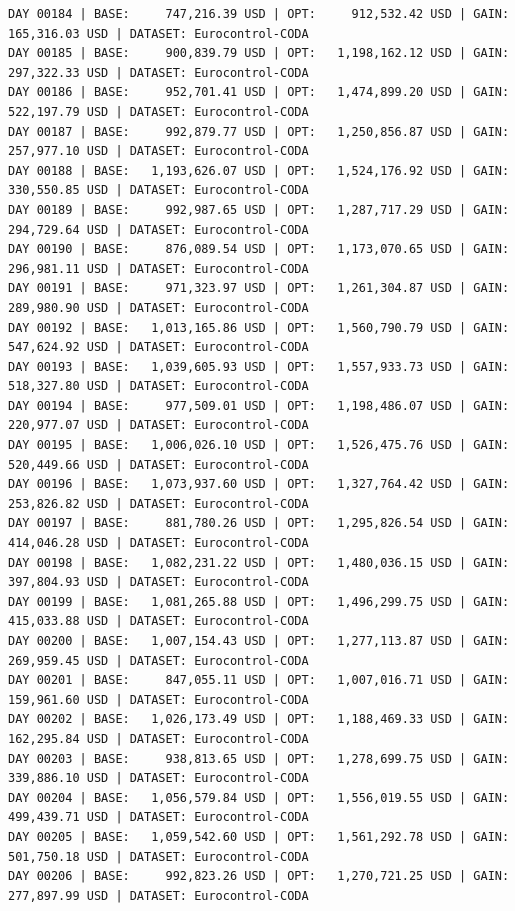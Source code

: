 \documentclass[11pt,a4paper]{article}
\begin{document}
\begin{verbatim}
DAY 00184 | BASE:     747,216.39 USD | OPT:     912,532.42 USD | GAIN: 165,316.03 USD | DATASET: Eurocontrol-CODA
DAY 00185 | BASE:     900,839.79 USD | OPT:   1,198,162.12 USD | GAIN: 297,322.33 USD | DATASET: Eurocontrol-CODA
DAY 00186 | BASE:     952,701.41 USD | OPT:   1,474,899.20 USD | GAIN: 522,197.79 USD | DATASET: Eurocontrol-CODA
DAY 00187 | BASE:     992,879.77 USD | OPT:   1,250,856.87 USD | GAIN: 257,977.10 USD | DATASET: Eurocontrol-CODA
DAY 00188 | BASE:   1,193,626.07 USD | OPT:   1,524,176.92 USD | GAIN: 330,550.85 USD | DATASET: Eurocontrol-CODA
DAY 00189 | BASE:     992,987.65 USD | OPT:   1,287,717.29 USD | GAIN: 294,729.64 USD | DATASET: Eurocontrol-CODA
DAY 00190 | BASE:     876,089.54 USD | OPT:   1,173,070.65 USD | GAIN: 296,981.11 USD | DATASET: Eurocontrol-CODA
DAY 00191 | BASE:     971,323.97 USD | OPT:   1,261,304.87 USD | GAIN: 289,980.90 USD | DATASET: Eurocontrol-CODA
DAY 00192 | BASE:   1,013,165.86 USD | OPT:   1,560,790.79 USD | GAIN: 547,624.92 USD | DATASET: Eurocontrol-CODA
DAY 00193 | BASE:   1,039,605.93 USD | OPT:   1,557,933.73 USD | GAIN: 518,327.80 USD | DATASET: Eurocontrol-CODA
DAY 00194 | BASE:     977,509.01 USD | OPT:   1,198,486.07 USD | GAIN: 220,977.07 USD | DATASET: Eurocontrol-CODA
DAY 00195 | BASE:   1,006,026.10 USD | OPT:   1,526,475.76 USD | GAIN: 520,449.66 USD | DATASET: Eurocontrol-CODA
DAY 00196 | BASE:   1,073,937.60 USD | OPT:   1,327,764.42 USD | GAIN: 253,826.82 USD | DATASET: Eurocontrol-CODA
DAY 00197 | BASE:     881,780.26 USD | OPT:   1,295,826.54 USD | GAIN: 414,046.28 USD | DATASET: Eurocontrol-CODA
DAY 00198 | BASE:   1,082,231.22 USD | OPT:   1,480,036.15 USD | GAIN: 397,804.93 USD | DATASET: Eurocontrol-CODA
DAY 00199 | BASE:   1,081,265.88 USD | OPT:   1,496,299.75 USD | GAIN: 415,033.88 USD | DATASET: Eurocontrol-CODA
DAY 00200 | BASE:   1,007,154.43 USD | OPT:   1,277,113.87 USD | GAIN: 269,959.45 USD | DATASET: Eurocontrol-CODA
DAY 00201 | BASE:     847,055.11 USD | OPT:   1,007,016.71 USD | GAIN: 159,961.60 USD | DATASET: Eurocontrol-CODA
DAY 00202 | BASE:   1,026,173.49 USD | OPT:   1,188,469.33 USD | GAIN: 162,295.84 USD | DATASET: Eurocontrol-CODA
DAY 00203 | BASE:     938,813.65 USD | OPT:   1,278,699.75 USD | GAIN: 339,886.10 USD | DATASET: Eurocontrol-CODA
DAY 00204 | BASE:   1,056,579.84 USD | OPT:   1,556,019.55 USD | GAIN: 499,439.71 USD | DATASET: Eurocontrol-CODA
DAY 00205 | BASE:   1,059,542.60 USD | OPT:   1,561,292.78 USD | GAIN: 501,750.18 USD | DATASET: Eurocontrol-CODA
DAY 00206 | BASE:     992,823.26 USD | OPT:   1,270,721.25 USD | GAIN: 277,897.99 USD | DATASET: Eurocontrol-CODA

\end{verbatim}
\end{document}

